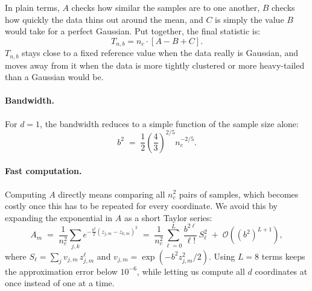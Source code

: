 In plain terms, $A$ checks how similar the samples are to one another, $B$ checks how quickly the data thins out around the mean, and $C$ is simply the value $B$ would take for a perfect Gaussian. Put together, the final statistic is:
\begin{equation}
	T_{n,b} = n_c \cdot \left[ A - B + C \right].
\end{equation}
$T_{n,b}$ stays close to a fixed reference value when the data really is Gaussian, and moves away from it when the data is more tightly clustered or more heavy-tailed than a Gaussian would be.

\paragraph{Bandwidth.}
For $d=1$, the bandwidth reduces to a simple function of the sample size alone:
\begin{equation}
	b^2 \;=\; \frac{1}{2}\left(\frac{4}{3}\right)^{2/5} n_c^{-2/5}.
	\label{eq:hz_bw_univariate}
\end{equation}

\paragraph{Fast computation.}
Computing $A$ directly means comparing all $n_c^2$ pairs of samples, which becomes costly once this has to be repeated for every coordinate. We avoid this by expanding the exponential in $A$ as a short Taylor series:
\begin{equation}
	A_m \;=\; \frac{1}{n_c^2}\sum_{j,k} e^{-\frac{b^2}{2}(z_{j,m}-z_{k,m})^2}
	\;=\; \frac{1}{n_c^2}\sum_{\ell=0}^{L}
	\frac{b^{2\ell}}{\ell!}\,S_\ell^2\;+\;\mathcal{O}\!\left((b^2)^{L+1}\right),
	\label{eq:hz_taylor}
\end{equation}
where $S_\ell = \sum_j v_{j,m}\,z_{j,m}^\ell$ and $v_{j,m} = \exp(-b^2 z_{j,m}^2 / 2)$. Using $L=8$ terms keeps the approximation error below $10^{-6}$, while letting us compute all $d$ coordinates at once instead of one at a time.

